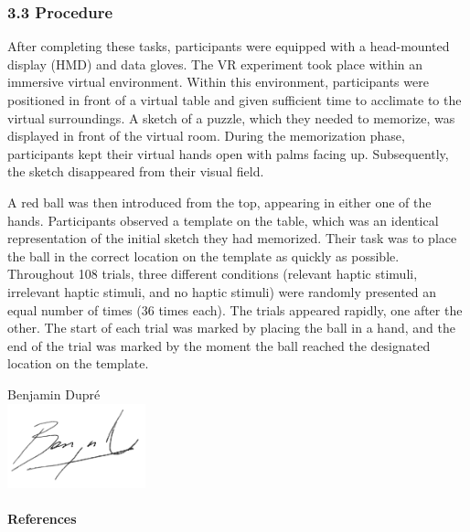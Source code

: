 \documentclass[12pt,oneside,openright]{report}
\begin{document}
\subsubsection*{3.3 Procedure}
After completing these tasks, participants were equipped with a head-mounted display (HMD) and data gloves. The VR experiment took place within an immersive virtual environment. Within this environment, participants were positioned in front of a virtual table and given sufficient time to acclimate to the virtual surroundings. A sketch of a puzzle, which they needed to memorize, was displayed in front of the virtual room. During the memorization phase, participants kept their virtual hands open with palms facing up. Subsequently, the sketch disappeared from their visual field.

 A red ball was then introduced from the top, appearing in either one of the hands. Participants observed a template on the table, which was an identical representation of the initial sketch they had memorized. Their task was to place the ball in the correct location on the template as quickly as possible. Throughout 108 trials, three different conditions (relevant haptic stimuli, irrelevant haptic stimuli, and no haptic stimuli) were randomly presented an equal number of times (36 times each). The trials appeared rapidly, one after the other. The start of each trial was marked by placing the ball in a hand, and the end of the trial was marked by the moment the ball reached the designated location on the template.


\vspace*{3cm}
\hfill  
\begin{center}
  Benjamin Dupré \\ 
  \includegraphics[width=4cm]{firma.png}
\end{center}

\pagebreak
\paragraph{\textbf{References}}
\printbibliography[heading=none]
\end{document}
